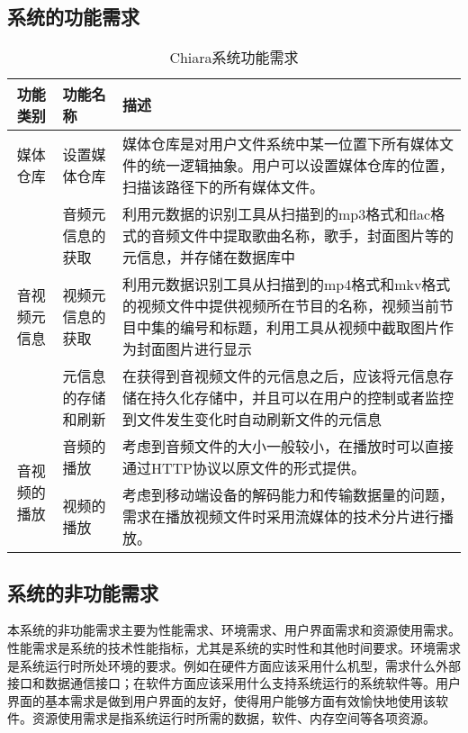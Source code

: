 \documentclass[main.tex]{subfiles}
\begin{document}
\subsection{系统的功能需求}

\begin{center}
\begin{longtable}{cp{6cm}p{6cm}}
    \caption{Chiara系统功能需求}
    \label{tab:function-requirements} \\
    \toprule
    \textbf{功能类别} & \textbf{功能名称} & \textbf{描述} \\
    \endhead
    媒体仓库 & 设置媒体仓库 & 媒体仓库是对用户文件系统中某一位置下所有媒体文件的统一逻辑抽象。用户可以设置媒体仓库的位置，扫描该路径下的所有媒体文件。\\
    \midrule
    \multirow{3}{*}{音视频元信息} & 音频元信息的获取 & 利用元数据的识别工具从扫描到的mp3格式和flac格式的音频文件中提取歌曲名称，歌手，封面图片等的元信息，并存储在数据库中 \\
    \cmidrule{2-3}
    & 视频元信息的获取 & 利用元数据识别工具从扫描到的mp4格式和mkv格式的视频文件中提供视频所在节目的名称，视频当前节目中集的编号和标题，利用工具从视频中截取图片作为封面图片进行显示 \\
    \cmidrule{2-3}
    & 元信息的存储和刷新 & 在获得到音视频文件的元信息之后，应该将元信息存储在持久化存储中，并且可以在用户的控制或者监控到文件发生变化时自动刷新文件的元信息 \\
    \midrule
    \multirow{2}{*}{音视频的播放} & 音频的播放 & 考虑到音频文件的大小一般较小，在播放时可以直接通过HTTP协议以原文件的形式提供。\\
    \cmidrule{2-3}
    & 视频的播放 & 考虑到移动端设备的解码能力和传输数据量的问题，需求在播放视频文件时采用流媒体的技术分片进行播放。\\
    \bottomrule
\end{longtable}
\end{center}

\subsection{系统的非功能需求}

本系统的非功能需求主要为性能需求、环境需求、用户界面需求和资源使用需求。性能需求是系统的技术性能指标，尤其是系统的实时性和其他时间要求。环境需求是系统运行时所处环境的要求。例如在硬件方面应该采用什么机型，需求什么外部接口和数据通信接口；在软件方面应该采用什么支持系统运行的系统软件等。用户界面的基本需求是做到用户界面的友好，使得用户能够方面有效愉快地使用该软件。资源使用需求是指系统运行时所需的数据，软件、内存空间等各项资源。
\end{document}
